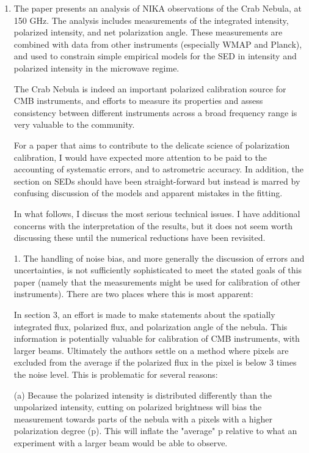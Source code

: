 \documentclass[12pt]{article}
\begin{document}
\begin{enumerate}
    \item 
The paper presents an analysis of NIKA observations of the Crab
Nebula, at 150 GHz. The analysis includes measurements of the
integrated intensity, polarized intensity, and net polarization angle.
These measurements are combined with data from other instruments
(especially WMAP and Planck), and used to constrain simple empirical
models for the SED in intensity and polarized intensity in the
microwave regime.

The Crab Nebula is indeed an important polarized calibration source
for CMB instruments, and efforts to measure its properties and assess
consistency between different instruments across a broad frequency
range is very valuable to the community.

For a paper that aims to contribute to the delicate science of
polarization calibration, I would have expected more attention to be
paid to the accounting of systematic errors, and to astrometric
accuracy. In addition, the section on SEDs should have been
straight-forward but instead is marred by confusing discussion of the
models and apparent mistakes in the fitting.

In what follows, I discuss the most serious technical issues. I have
additional concerns with the interpretation of the results, but it
does not seem worth discussing these until the numerical reductions
have been revisited.


1. The handling of noise bias, and more generally the discussion of
errors and uncertainties, is not sufficiently sophisticated to meet the
stated goals of this paper (namely that the measurements might be used
for calibration of other instruments). There are two places where
this is most apparent:


In section 3, an effort is made to make statements about the spatially
integrated flux, polarized flux, and polarization angle of the nebula.
This information is potentially valuable for calibration of CMB
instruments, with larger beams. Ultimately the authors settle on a
method where pixels are excluded from the average if the polarized
flux in the pixel is below 3 times the noise level. This is
problematic for several reasons:

(a) Because the polarized intensity is distributed differently than
the unpolarized intensity, cutting on polarized brightness will bias
the measurement towards parts of the nebula with a pixels with a
higher polarization degree (p). This will inflate the "average" p
relative to what an experiment with a larger beam would be able to
observe.


\end{enumerate}
\end{document}

